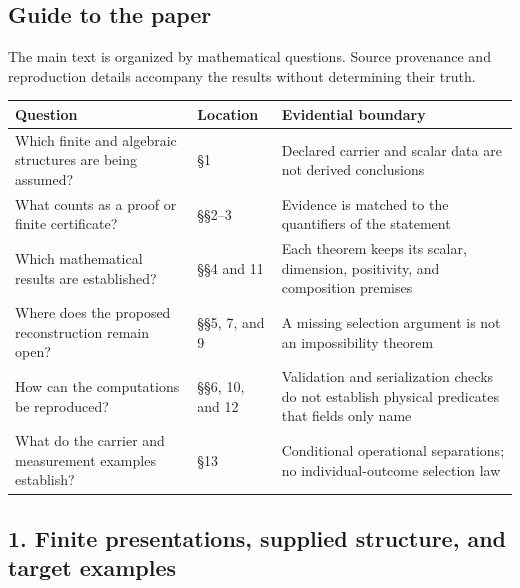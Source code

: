 \documentclass[
  11pt,
]{article}
\begin{document}
\subsection{Guide to the paper}\label{guide-to-the-paper}

The main text is organized by mathematical questions. Source provenance
and reproduction details accompany the results without determining their
truth.

\begin{longtable}[]{@{}
  >{\raggedright\arraybackslash}p{}
  >{\raggedright\arraybackslash}p{}
  >{\raggedright\arraybackslash}p{}@{}}
\toprule\noalign{}
\begin{minipage}[b]{\linewidth}\raggedright
Question
\end{minipage} & \begin{minipage}[b]{\linewidth}\raggedright
Location
\end{minipage} & \begin{minipage}[b]{\linewidth}\raggedright
Evidential boundary
\end{minipage} \\
\midrule\noalign{}
\endhead
\bottomrule\noalign{}
\endlastfoot
Which finite and algebraic structures are being assumed? & §1 & Declared
carrier and scalar data are not derived conclusions \\
What counts as a proof or finite certificate? & §§2--3 & Evidence is
matched to the quantifiers of the statement \\
Which mathematical results are established? & §§4 and 11 & Each theorem
keeps its scalar, dimension, positivity, and composition premises \\
Where does the proposed reconstruction remain open? & §§5, 7, and 9 & A
missing selection argument is not an impossibility theorem \\
How can the computations be reproduced? & §§6, 10, and 12 & Validation
and serialization checks do not establish physical predicates that
fields only name \\
What do the carrier and measurement examples establish? & §13 &
Conditional operational separations; no individual-outcome selection
law \\
\end{longtable}

\subsection{1. Finite presentations, supplied structure, and target
examples}\label{finite-presentations-supplied-structure-and-target-examples}
\end{document}
